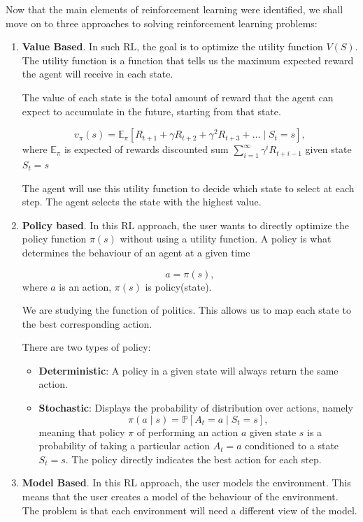 \documentclass{article}
\numberwithin{equation}{subsection}
\begin{document}
Now that the main elements of reinforcement learning were identified, we shall move on to three approaches \cite{sutton2018reinforcement} to solving reinforcement learning problems:
\begin{enumerate}
	\item \textbf{Value Based}.
		In such RL, the goal is to optimize the utility function $V(S)$.
		The utility function is a function that tells us the maximum expected reward the agent will receive in each state.
		
		The value of each state is the total amount of reward that the agent can expect to accumulate in the future, starting from that state.

		\begin{equation}
			v_\pi(s)=\mathbb{E}_\pi\left[R_{t+1}+\gamma R_{t+2}+\gamma^2 R_{t+3}+\ldots \mid S_t=s\right],
		\end{equation}
		where $\mathbb{E}_\pi$ is expected of rewards discounted sum $\sum_{i=1}^{\infty}\gamma^iR_{t+{i-1}}$ given state $S_t=s$
		
		The agent will use this utility function to decide which state to select at each step. The agent selects the state with the highest value.
	\item \textbf{Policy based}. In this RL approach, the user wants to directly optimize the policy function $\pi(s)$ without using a utility function. A policy is what determines the behaviour of an agent at a given time 
		
		\begin{equation}
			a = \pi(s),
		\end{equation}		
		where $a$ is an action, $\pi(s)$ is policy(state).
		
		We are studying the function of politics. This allows us to map each state to the best corresponding action.
		
		There are two types of policy:
\begin{itemize}
	\item \textbf{Deterministic}: A policy in a given state will always return the same action.
	\item \textbf{Stochastic}: Displays the probability of distribution over actions, namely
		\begin{equation} 
			\pi(a \mid s)=\mathbb{P}\left[A_t=a \mid S_t=s\right],
		\end{equation}
		meaning that policy $\pi$ of performing an action $a$ given state $s$ is a probability of taking a particular action $A_t=a$ conditioned to a state $S_t=s$. The policy directly indicates the best action for each step.
\end{itemize}
		
	\item \textbf{Model Based}. In this RL approach, the user models the environment. This means that the user creates a model of the behaviour of the environment. The problem is that each environment will need a different view of the model. 
\end{enumerate}
\end{document}
